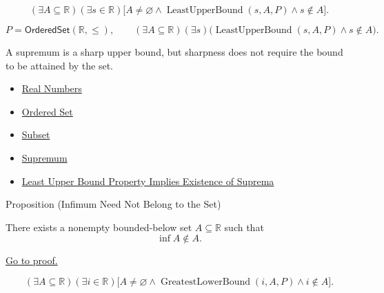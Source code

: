 \begin{remark*}
\[
  (\exists A\subseteq\mathbb{R})(\exists s\in\mathbb{R})
  \bigl[A\neq\varnothing\land \operatorname{LeastUpperBound}(s,A,P)\land s\notin A\bigr].
\]
\end{remark*}

\begin{remark*}
\[
  P=\mathsf{OrderedSet}(\mathbb{R},\leq),\qquad
  (\exists A\subseteq\mathbb{R})(\exists s)\bigl(\operatorname{LeastUpperBound}(s,A,P)\land s\notin A\bigr).
\]
\end{remark*}

\begin{remark*}[Interpretation]
A supremum is a sharp upper bound, but sharpness does not require the bound
to be attained by the set.
\end{remark*}

\begin{dependencies}
\begin{itemize}
  \item \hyperref[def:reals]{Real Numbers}
  \item \hyperref[def:ordered-set]{Ordered Set}
  \item \hyperref[def:subset]{Subset}
  \item \hyperref[def:supremum]{Supremum}
  \item \hyperref[thm:lub-property-implies-existence-of-suprema]{Least Upper Bound Property Implies Existence of Suprema}
\end{itemize}
\end{dependencies}

\begin{propositionbox}{Proposition (Infimum Need Not Belong to the Set)}
\begin{proposition}
\label{prop:infimum-need-not-belong-to-the-set}
There exists a nonempty bounded-below set $A\subseteq\mathbb{R}$ such that
\[
  \inf A\notin A.
\]

\hyperref[prf:infimum-need-not-belong-to-the-set]{Go to proof.}
\end{proposition}
\end{propositionbox}

\begin{remark*}
\[
  (\exists A\subseteq\mathbb{R})(\exists i\in\mathbb{R})
  \bigl[A\neq\varnothing\land \operatorname{GreatestLowerBound}(i,A,P)\land i\notin A\bigr].
\]
\end{remark*}

